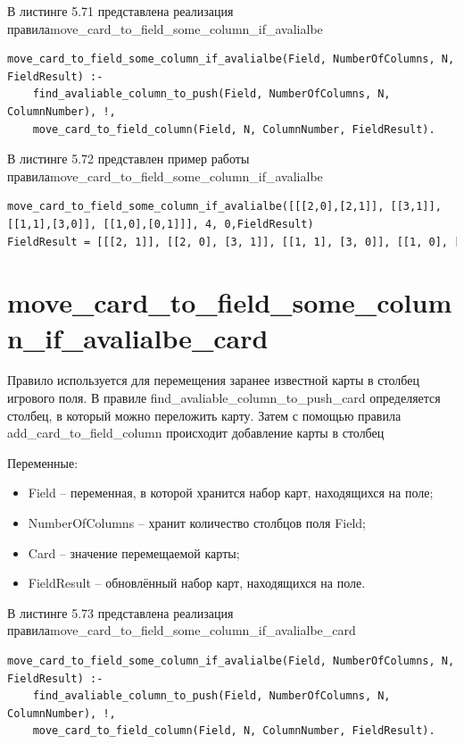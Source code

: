 \documentclass[12pt]{report}
\begin{document}
В листинге 5.71 представлена реализация правила\newline move\_card\_to\_field\_some\_column\_if\_avalialbe

\begin{lstlisting}[label=some-code, caption=реализация правила move\_card\_to\_field\_some\_column\_if\_avalialbe] 
move_card_to_field_some_column_if_avalialbe(Field, NumberOfColumns, N, FieldResult) :-
	find_avaliable_column_to_push(Field, NumberOfColumns, N, ColumnNumber), !,
	move_card_to_field_column(Field, N, ColumnNumber, FieldResult).
\end{lstlisting}

В листинге 5.72 представлен пример работы правила\newline move\_card\_to\_field\_some\_column\_if\_avalialbe

\begin{lstlisting}[label=some-code, caption=реализация правила move\_card\_to\_field\_some\_column\_if\_avalialbe] 
move_card_to_field_some_column_if_avalialbe([[[2,0],[2,1]], [[3,1]], [[1,1],[3,0]], [[1,0],[0,1]]], 4, 0,FieldResult)
FieldResult = [[[2, 1]], [[2, 0], [3, 1]], [[1, 1], [3, 0]], [[1, 0], [0, 1]]]
\end{lstlisting}
\section{move\_card\_to\_field\_some\_column\_if\_avalialbe\_card}
Правило используется для перемещения заранее известной карты в столбец игрового поля. В правиле find\_avaliable\_column\_to\_push\_card определяется столбец, в который можно переложить карту. Затем с помощью правила add\_card\_to\_field\_column происходит добавление карты в столбец 

Переменные:
\begin{itemize}
\item Field – переменная, в которой хранится набор карт, находящихся на поле;
\item NumberOfColumns – хранит количество столбцов поля Field;
\item Card – значение перемещаемой карты;
\item FieldResult – обновлённый набор карт, находящихся на поле.
\end{itemize}

В листинге 5.73 представлена реализация правила\newline move\_card\_to\_field\_some\_column\_if\_avalialbe\_card

\begin{lstlisting}[label=some-code, caption=реализация \newline правила move\_card\_to\_field\_some\_column\_if\_avalialbe\_card] 
move_card_to_field_some_column_if_avalialbe(Field, NumberOfColumns, N, FieldResult) :-
	find_avaliable_column_to_push(Field, NumberOfColumns, N, ColumnNumber), !,
	move_card_to_field_column(Field, N, ColumnNumber, FieldResult).
\end{lstlisting}
\end{document}
